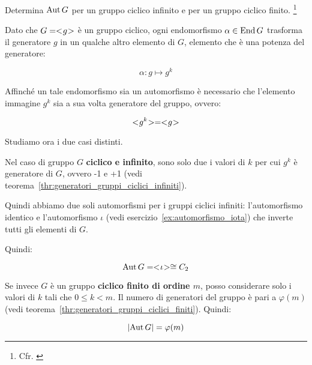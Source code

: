 \begin{esercizio}
	Determina $\operatorname{Aut} G$ per un gruppo ciclico infinito e per un gruppo ciclico finito.
	\footnote{Cfr. \cite[pag. 63, es. n. 4]{jacobson}}
\end{esercizio}
\begin{soluzione}
	Dato che $G = < \negmedspace g \negmedspace >$ è un gruppo ciclico, ogni endomorfismo $\alpha \in \operatorname{End} G$ trasforma il generatore $g$ in un qualche altro elemento di $G$, elemento che è una potenza del generatore:
	
	\begin{equation}
		\alpha: g \longmapsto g^k
	\end{equation}

	Affinché un tale endomorfismo sia un automorfismo è necessario che l'elemento immagine $g^k$ sia a sua volta generatore del gruppo, ovvero:
	
	\begin{equation}
		< \negmedspace g^k \negmedspace > = < \negmedspace g \negmedspace >
	\end{equation}

	Studiamo ora i due casi distinti.
	
	Nel caso di gruppo $G$ \textbf{ciclico e infinito}, sono solo due i valori di $k$ per cui $g^k$ è generatore di $G$, ovvero -1 e +1 (vedi teorema~\ref{thr:generatori_gruppi_ciclici_infiniti}).
	
	Quindi abbiamo due soli automorfismi per i gruppi ciclici infiniti: l'automorfismo identico e l'automorfismo $\iota$ (vedi esercizio~\ref{ex:automorfismo_iota}) che inverte tutti gli elementi di $G$.
	
	Quindi:
	
	\begin{equation}
		\operatorname{Aut} G = < \negmedspace \iota \negmedspace > \cong C_2
	\end{equation}

	Se invece $G$ è un gruppo \textbf{ciclico finito di ordine $m$}, posso considerare solo i valori di $k$ tali che $0 \le k < m$. Il numero di generatori del gruppo è pari a $\varphi(m)$ (vedi teorema~\ref{thr:generatori_gruppi_ciclici_finiti}). Quindi:
	
	\begin{equation}
		\lvert \operatorname{Aut} G \rvert = \varphi(m)
	\end{equation}
\end{soluzione}

